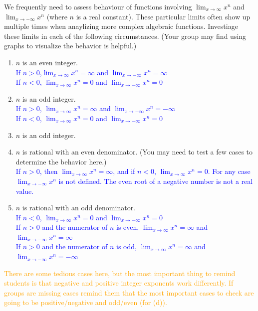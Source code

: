 \documentclass{ximera}
\begin{document}
\begin{exercise}
  We frequently need to assess behaviour of functions involving $\lim_{x\rightarrow \infty}x^n$ and $\lim_{x\rightarrow -\infty}x^n$ (where $n$ is a real constant).  These particular limits often show up multiple times when anaylizing more complex algebraic functions.  Investiage these limits in each of the following circumstances. (Your group may find using graphs to visualize the behavior is helpful.)
  \begin{enumerate}
    \item $n$ is an even integer.\\
    \textcolor{blue}{If $n>0$,$\displaystyle\lim_{x\rightarrow \infty} x^n=\infty$ and $\displaystyle\lim_{x\rightarrow -\infty} x^n=\infty$\\
    If $n<0$, $\displaystyle \lim_{x\rightarrow \infty}x^n=0$ and $\displaystyle \lim_{x\rightarrow -\infty}x^n=0$}
    \item $n$ is an odd integer.\\
    \textcolor{blue}{If $n>0$, $\displaystyle\lim_{x\rightarrow \infty} x^n=\infty$ and $\displaystyle\lim_{x\rightarrow -\infty} x^n=-\infty$\\
    If $n<0$, $\displaystyle \lim_{x\rightarrow \infty}x^n=0$ and $\displaystyle \lim_{x\rightarrow -\infty}x^n=0$}
    \item $n$ is an odd integer.
    \item $n$ is rational with an even denominator. (You may need to test a few cases to determine the behavior here.)\\
    \textcolor{blue}{If $n>0$, then $\displaystyle \lim_{x\rightarrow \infty}x^n=\infty$, and if $n<0$, $\lim_{x\rightarrow \infty}x^n=0$.  For any case $\lim_{x\rightarrow -\infty}x^n$ is not defined.  The even root of a negative number is not a real value.}
    \item $n$ is rational with an odd denominator.\\
    \textcolor{blue}{If $n<0$, $\displaystyle \lim_{x\rightarrow \infty}x^n=0$ and $\displaystyle \lim_{x\rightarrow -\infty}x^n=0$\\
    If $n>0$ and the numerator of $n$ is even, $\displaystyle \lim_{x\rightarrow \infty}x^n=\infty$ and $\displaystyle \lim_{x\rightarrow -\infty}x^n=\infty$\\
    If $n>0$ and the numerator of $n$ is odd, $\displaystyle \lim_{x\rightarrow \infty}x^n=\infty$ and $\displaystyle \lim_{x\rightarrow -\infty}x^n=-\infty$}
  \end{enumerate}
  \textcolor{orange}{There are some tedious cases here, but the most important thing to remind students is that negative and positive integer exponents work differently.  If groups are missing cases remind them that the most important cases to check are going to be positive/negative and odd/even (for (d)).}
\end{exercise}
\end{document}
